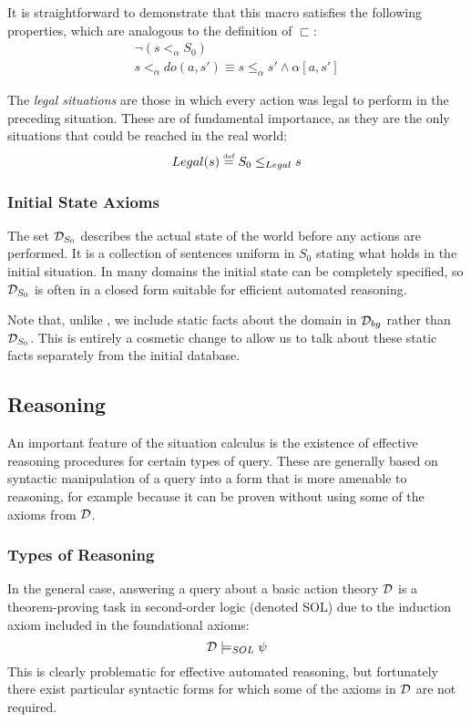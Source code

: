 It is straightforward to demonstrate that this macro satisfies the
following properties, which are analogous to the definition of $\sqsubset$:\begin{gather*}
\neg\left(s<_{\alpha}S_{0}\right)\\
s<_{\alpha}do(a,s')\equiv s\leq_{\alpha}s'\wedge\alpha[a,s']\end{gather*}


The \emph{legal situations} are those in which every action was legal
to perform in the preceding situation. These are of fundamental importance,
as they are the only situations that could be reached in the real
world:\[
Legal(s)\stackrel{\mbox{\tiny def}}{=} S_{0}\leq_{Legal}s\]



\subsubsection{Initial State Axioms}

The set $\mathcal{D}_{S_{0}}$ describes the actual state of the world before
any actions are performed. It is a collection of sentences uniform
in $S_{0}$ stating what holds in the initial situation. In many domains
the initial state can be completely specified, so $\mathcal{D}_{S_{0}}$ is
often in a closed form suitable for efficient automated reasoning.

Note that, unlike \citep{levesque98sc_foundations,pirri99contributions_sitcalc,reiter01kia},
we include static facts about the domain in $\mathcal{D}_{bg}$ rather than
$\mathcal{D}_{S_{0}}$. This is entirely a cosmetic change to allow us to
talk about these static facts separately from the initial database.


\subsection{Reasoning\label{sec:Background:Reasoning}}

An important feature of the situation calculus is the existence of
effective reasoning procedures for certain types of query. These are
generally based on syntactic manipulation of a query into a form that
is more amenable to reasoning, for example because it can be proven
without using some of the axioms from $\mathcal{D}$.


\subsubsection{Types of Reasoning}

In the general case, answering a query about a basic action theory
$\mathcal{D}$ is a theorem-proving task in second-order logic (denoted SOL)
due to the induction axiom included in the foundational axioms:\[
\mathcal{D}\models_{SOL}\psi\]
 This is clearly problematic for effective automated reasoning, but
fortunately there exist particular syntactic forms for which some
of the axioms in $\mathcal{D}$ are not required.

